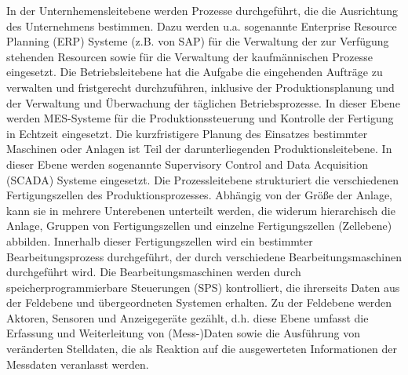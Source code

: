 In der Unternhemensleitebene werden Prozesse durchgeführt, die die Ausrichtung des Unternehmens bestimmen. Dazu werden u.a. sogenannte Enterprise Resource Planning (ERP) Systeme (z.B. von SAP) für die Verwaltung der zur Verfügung stehenden Resourcen sowie für die Verwaltung der kaufmännischen Prozesse eingesetzt.
Die Betriebsleitebene hat die Aufgabe die eingehenden Aufträge zu verwalten und fristgerecht durchzuführen, inklusive der Produktionsplanung und der Verwaltung und Überwachung der täglichen Betriebsprozesse. In dieser Ebene werden MES-Systeme für die Produktionssteuerung und Kontrolle der Fertigung in Echtzeit eingesetzt. %
Die kurzfristigere Planung des Einsatzes bestimmter Maschinen oder Anlagen ist Teil der darunterliegenden Produktionsleitebene. In dieser Ebene werden sogenannte Supervisory Control and Data Acquisition (SCADA) Systeme eingesetzt. 
Die Prozessleitebene strukturiert die verschiedenen Fertigungszellen des Produktionsprozesses. Abhängig von der Größe der Anlage, kann sie in mehrere Unterebenen unterteilt werden, die widerum hierarchisch die Anlage, Gruppen von Fertigungszellen und einzelne Fertigungszellen (Zellebene) abbilden. Innerhalb dieser Fertigungszellen wird ein bestimmter Bearbeitungsprozess durchgeführt, der durch verschiedene Bearbeitungsmaschinen durchgeführt wird. Die Bearbeitungsmaschinen werden durch speicherprogrammierbare Steuerungen (SPS) kontrolliert, die ihrerseits Daten aus der Feldebene und übergeordneten Systemen erhalten.
Zu der Feldebene werden Aktoren, Sensoren und Anzeigegeräte gezählt, d.h. diese Ebene umfasst die Erfassung und Weiterleitung von (Mess-)Daten sowie die Ausführung von veränderten Stelldaten, die als Reaktion auf die ausgewerteten Informationen der Messdaten veranlasst werden.

